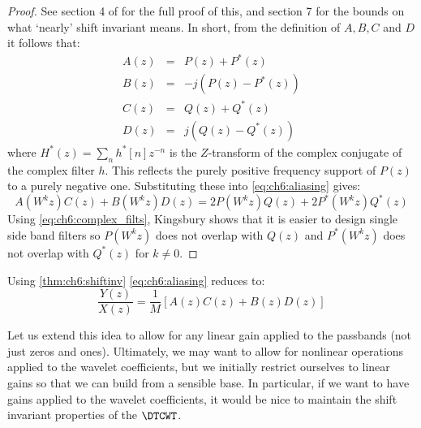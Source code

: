 \begin{proof}
  See section 4 of \cite{kingsbury_complex_2001} for the full proof of
  this, and section 7 for the bounds on what `nearly' shift invariant means. 
  In short, from the definition of $A, B, C$ and $D$ it follows that:  
  \begin{eqnarray*}
    A(z) &=& P(z) + P^*(z) \\
    B(z) &=& -j(P(z) - P^*(z)) \\
    C(z) &=& Q(z) + Q^*(z) \\
    D(z) &=& j(Q(z) - Q^*(z))
  \end{eqnarray*}
  where $H^*(z) = \sum_n h^*[n]z^{-n}$ is the $Z$-transform of the complex
  conjugate of the complex filter $h$. This reflects the purely positive
  frequency support of $P(z)$ to a purely negative one. Substituting these into
  \eqref{eq:ch6:aliasing} gives:
  \begin{equation}
    A(W^k z)C(z) + B(W^k z)D(z) = 2P(W^kz)Q(z) + 2P^*(W^kz)Q^*(z)
    \label{eq:ch6:complex_filts}
  \end{equation}
 Using \eqref{eq:ch6:complex_filts}, Kingsbury shows that it is easier to design
 single side band filters so $P(W^kz)$ does not overlap with $Q(z)$ and
 $P^*(W^kz)$ does not overlap with $Q^*(z)$ for $k \neq 0$.
\end{proof}

Using \autoref{thm:ch6:shiftinv} \eqref{eq:ch6:aliasing} reduces to:
\begin{equation}
 \frac{Y(z)}{X(z)} = \frac{1}{M}\left[ A(z)C(z) + B(z)D(z) \right]
  \label{eq:ch6:aliasing_cancel}
\end{equation}

Let us extend this idea to allow for any linear gain applied to the passbands
(not just zeros and ones). Ultimately, we may want to allow for nonlinear
operations applied to the wavelet coefficients, but we initially restrict
ourselves to linear gains so that we can build from a sensible base. In
particular, if we want to have gains applied to the wavelet coefficients, it
would be nice to maintain the shift invariant properties of the $\DTCWT$.

\begin{figure}
  \centering
  
  \label{fig:ch6:dtcwt_two_tree_gain}
\end{figure}

